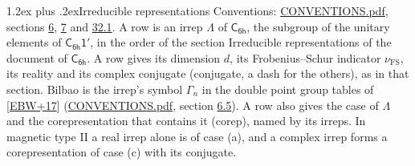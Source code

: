 \documentclass[10pt,a4paper]{article}
\makeatletter
\renewcommand\section{\@startsection{section}{1}{\z@}{-3ex plus -1ex minus -.2ex}%
  {1.2ex plus .2ex}{\normalfont\large\sffamily\bfseries\color{parttitle}}}
\numberwithin{equation}{section}
\newcommand{\grp}[1]{\mathsf{#1}}
\newcommand{\fsind}{\nu_{\mathrm{FS}}}
\makeatother
\begin{document}
\section{Irreducible representations}\label{s:irreps}
Conventions: \href{../../CONVENTIONS.pdf}{CONVENTIONS.pdf}, sections \href{../../../rotation/CONVENTIONS.pdf\#conv.6}{6}, \href{../../../rotation/CONVENTIONS.pdf\#conv.7}{7} and \href{../../CONVENTIONS.pdf\#conv.32.1}{32.1}.
\leavevmode\label{n:irrep.Delta}A row is an irrep $\Lambda$ of $\grp{C_{6h}}$, the subgroup of the unitary elements of $\grp{C_{6h}1'}$, in the order of the section Irreducible representations of the document of \href{../../../rotation/data/pdf/C6h.pdf}{$\grp{C_{6h}}$}. \label{n:index.dimension}\label{n:index.frobenius}\label{n:head.irrep}\label{n:head.reality}\label{n:head.conjugate}A row gives its dimension $d$, its Frobenius--Schur indicator $\fsind$, its reality and its complex conjugate (conjugate, a dash for the others), as in that section. \label{n:head.bilbao}\label{n:irrep.alias.gamma}Bilbao is the irrep's symbol $\Gamma_n$ in the double point group tables of [\href{../../../REFERENCES.pdf\#ref.EBW+17}{EBW+17}] (\href{../../CONVENTIONS.pdf}{CONVENTIONS.pdf}, section \href{../../../rotation/CONVENTIONS.pdf\#conv.6.5}{6.5}). \label{n:head.case.corep}\label{n:head.corep}A row also gives the case of $\Lambda$ and the corepresentation that contains it (corep), named by its irreps. In magnetic type II a real irrep alone is of case (a), and a complex irrep forms a corepresentation of case (c) with its conjugate.
\setlength{\emergencystretch}{2em}\par\setlength{\emergencystretch}{0pt}
\end{document}
